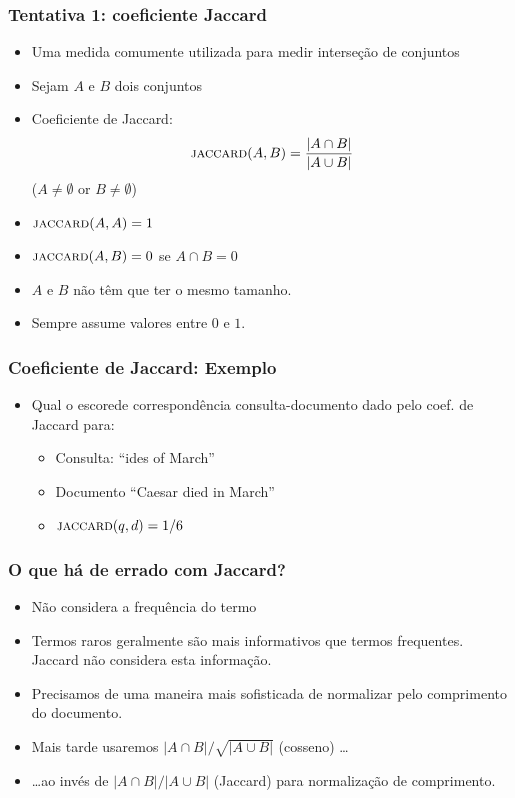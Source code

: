 \documentclass[compress]{beamer}
\begin{document}
\begin{frame}[<+->]
\frametitle{Tentativa 1: coeficiente Jaccard}
\pause[2]
\begin{itemize}
\item  Uma medida comumente utilizada para medir interseção de conjuntos
\item Sejam $A$ e $B$ dois conjuntos
\item Coeficiente de Jaccard: \[\mbox{\sc jaccard}(A,B) =\frac{|A \cap B|}{|A \cup
B|}\] ($A \neq \emptyset$ or $B \neq \emptyset$)
\item $\mbox{\sc jaccard}(A,A) = 1$
\item $\mbox{\sc jaccard}(A,B) = 0$ se $A \cap B = 0$
\item $A$ e $B$ não têm que ter o mesmo tamanho.
\item Sempre assume valores entre $0$ e $1$.
\end{itemize}
\end{frame}

\begin{frame}[<+->]
\frametitle{Coeficiente de Jaccard: Exemplo}
\pause[2]
\begin{itemize}
\item Qual o escorede correspondência consulta-documento dado pelo coef. de Jaccard para:
\begin{itemize}
\item Consulta: ``ides of March''
\item Documento ``Caesar died in March''
\item $\mbox{\sc jaccard}(q,d) = 1/6$
\end{itemize}
\end{itemize}
\end{frame}

\begin{frame}[<+->]
\frametitle{O que há de errado com Jaccard?}
\pause[2]
\begin{itemize}
\item Não considera a frequência do termo
\item Termos raros geralmente são mais informativos que termos frequentes. Jaccard não considera esta informação.
\item Precisamos de uma maneira mais sofisticada de normalizar pelo comprimento do documento.
\item Mais tarde usaremos
$|A \cap B|/\sqrt{|A \cup
B|}$ (cosseno) \ldots
\item \ldots ao invés de 
$|A \cap B|/|A \cup
B|$ (Jaccard) para normalização de comprimento.
\end{itemize}
\end{frame}
\end{document}
